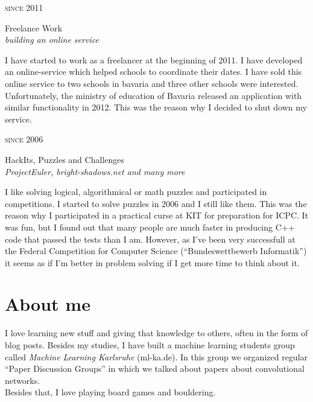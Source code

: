 \documentclass[a4paper,10pt]{article} %
\begin{document}
{\begin{minipage}[t]{0.5\textwidth}

{\raggedleft\textsc{since 2011}\par}

{\raggedright\large Freelance Work\\
\textit{building an online service}\\[5pt]}

\normalsize{I have started to work as a freelancer at the beginning
of 2011. I have developed an online-service which helped
schools to coordinate their dates. I have sold this online service to
two schools in bavaria and three other schools were interested.
Unfortunately, the ministry of education of Bavaria
released an application with similar functionality in
2012. This was the reason why I decided to shut down my service.}\\

{\raggedleft\textsc{since 2006}\par}

{\raggedright\large HackIts, Puzzles and Challenges\\
\textit{ProjectEuler, bright-shadows.net and many more}\\[5pt]}

\normalsize{I like solving logical, algorithmical or math
puzzles and participated in competitions. I started to solve puzzles
in 2006 and I still like them. This was the reason why I participated
in a practical curse at KIT for preparation for ICPC. It was fun,
but I found out that many people are much faster in producing C++
code that passed the tests than I am.
However, as I've been very successfull at the Federal Competition for
Computer Science (``Bundeswettbewerb Informatik'') it seems as if I'm
better in problem solving if I get more time to think about it.}\\

\section{About me}
I love learning new stuff and giving that knowledge to others, often in the
form of blog posts. Besides my studies, I have built a machine learning
students group called \textit{Machine Learning Karlsruhe} (ml-ka.de). In this
group we organized regular \enquote{Paper Discussion Groups} in which we talked
about papers about convolutional networks.\\
Besides that, I love playing board games and bouldering.


\end{minipage}}
\end{document}
